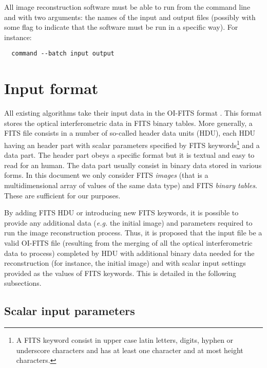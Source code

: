 \documentclass{article}
\newcommand*{\ROW}{} %
\newcommand*{\ROWTITLE}{} %
\newcommand{\KEYWORD}[1]{\texttt{#1}} %
\begin{document}
All image reconstruction software must be able to run from the command line
and with two arguments: the names of the input and output files (possibly with
some flag to indicate that the software must be run in a specific way).   For
instance:
\begin{verbatim}
  command --batch input output
\end{verbatim}


\section{Input format}

All existing algorithms take their input data in the OI-FITS format
\citep{Pauls_et_al-2005-oifits}.  This format stores the optical
interferometric data in FITS binary tables.  More generally, a FITS file
\citep{Pence_et_al-2010-FITS} consists in a number of so-called header data
units (HDU), each HDU having an header part with scalar parameters
specified by FITS keywords\footnote{A FITS keyword consist in upper case
  latin letters, digits, hyphen or underscore characters and has at least
  one character and at most height characters.} and a data part.  The
header part obeys a specific format but it is textual and easy to read for
an human.  The data part usually consist in binary data stored in various
forms.  In this document we only consider FITS \emph{images} (that is a
multidimensional array of values of the same data type) and FITS
\emph{binary tables}.  These are sufficient for our purposes.

By adding FITS HDU or introducing new FITS keywords, it is possible to provide
any additional data (\emph{e.g.} the initial image) and parameters required to
run the image reconstruction process.  Thus, it is proposed that the input
file be a valid OI-FITS file (resulting from the merging of all the optical
interferometric data to process) completed by HDU with additional binary data
needed for the reconstruction (for instance, the initial image) and with
scalar input settings provided as the values of FITS keywords.  This is
detailed in the following subsections.


\subsection{Scalar input parameters}

\renewcommand{\ROW}[3]{\KEYWORD{#1} & #2 &#3 \\}
\renewcommand{\ROWTITLE}[1]{\multicolumn{3}{c}{\textbf{#1}} \\
  Keyword & Type & Description \\}
\end{document}
